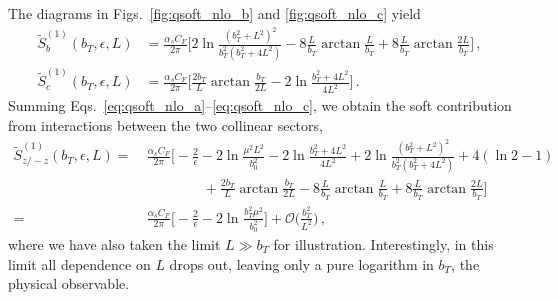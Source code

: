 \documentclass[11pt,a4paper]{article}
\DeclareRobustCommand{\figs}[2]{Figs.~\ref{fig:#1} and \ref{fig:#2}}
\newcommand{\eps}{\epsilon}
\newcommand{\cO}{\mathcal{O}}
\newcommand{\nn}{\nonumber}
\newcommand{\as}{\alpha_s}
\newcommand{\Lb}[1]{\ln^{#1}\frac{b_T^2 \mu^2}{b_0^2}}
\begin{document}
The diagrams in \figs{qsoft_nlo_b}{qsoft_nlo_c} yield
\begin{align}
 \label{eq:qsoft_nlo_b}
 \tilde S_b^{(1)}(b_T,\eps,L) &
 = \frac{\as C_F}{2\pi} \biggl[ 2 \ln\frac{(b_T^2 + L^2)^2}{b_T^2 ( b_T^2 + 4L^2)}
  - 8 \frac{L}{b_T} \arctan\frac{L}{b_T} + 8 \frac{L}{b_T} \arctan\frac{2L}{b_T} \biggr]
\,,\\
 \label{eq:qsoft_nlo_c}
 \tilde S_c^{(1)}(b_T,\eps,L) &
 = \frac{\as C_F}{2\pi} \biggl[ \frac{2 b_T}{L} \arctan\frac{b_T}{2L} - 2 \ln\frac{b_T^2 + 4 L^2}{4 L^2} \biggr]
\,.\end{align}
Summing Eqs.~\eqref{eq:qsoft_nlo_a}--\eqref{eq:qsoft_nlo_c}, we obtain
the soft contribution from interactions between the two collinear sectors,
\begin{align} \label{eq:qsoft_nlo_zz}
 \tilde S_{z/-z}^{(1)}(b_T,\eps,L)
 =~&\frac{\as C_F}{2\pi} \biggl[
  - \frac{2}{\eps} - 2 \ln\frac{\mu^2 L^2}{b_0^2} - 2 \ln\frac{b_T^2 + 4 L^2}{4 L^2}
  + 2\ln\frac{(b_T^2 + L^2)^2}{b_T^2(b_T^2 + 4L^2)}
  + 4 (\ln2-1)
  \nn\\&\qquad\qquad
  + \frac{2 b_T}{L} \arctan\frac{b_T}{2L}
  - 8 \frac{L}{b_T} \arctan\frac{L}{b_T} + 8 \frac{L}{b_T} \arctan\frac{2L}{b_T}  \biggr]
\nn\\
 =
 ~&\frac{\as C_F}{2\pi} \biggl[ - \frac{2}{\eps} - 2 \Lb{} \biggr] + \cO\biggl(\frac{b_T^2}{L^2}\biggr)
\,,\end{align}
where we have also taken the limit $L\gg b_T$ for illustration.
Interestingly, in this limit all dependence on $L$ drops out,
leaving only a pure logarithm in $b_T$, the physical observable.
\end{document}
